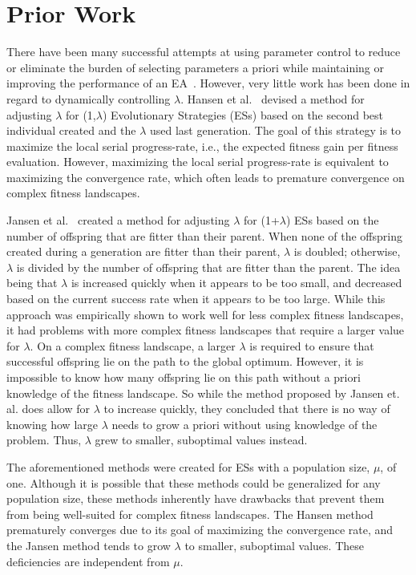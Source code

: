 \section{Prior Work} \label{sec:previous}

There have been many successful attempts at using parameter control to reduce or eliminate the burden of selecting parameters a priori while maintaining or improving the performance of an EA~\cite{paramsetting}. However, very little work has been done in regard to dynamically controlling $\lambda$. Hansen et al.~\cite{hansen:onsizing} devised a method for adjusting $\lambda$ for (1,$\lambda$) Evolutionary Strategies (ESs) based on the second best individual created and the $\lambda$ used last generation.  The goal of this strategy is to maximize the local serial progress-rate, i.e., the expected fitness gain per fitness evaluation.  However, maximizing the local serial progress-rate is equivalent to maximizing the convergence rate, which often leads to premature convergence on complex fitness landscapes.

Jansen et al.~\cite{jansen:choice} created a method for adjusting  $\lambda$ for (1+$\lambda$) ESs based on the number of offspring that are fitter than their parent.  When none of the offspring created during a generation are fitter than their parent, $\lambda$ is doubled; otherwise, $\lambda$ is divided by the number of offspring that are fitter than the parent.  The idea being that $\lambda$ is increased quickly when it appears to be too small, and decreased based on the current success rate when it appears to be too large.  While this approach was empirically shown to work well for less complex fitness landscapes, it had problems with more complex fitness landscapes that require a larger value for $\lambda$.  On a complex fitness landscape, a larger $\lambda$ is required to ensure that successful offspring lie on the path to the global optimum.  However, it is impossible to know how many offspring lie on this path without a priori knowledge of the fitness landscape.  So while the method proposed by Jansen et. al. does allow for  $\lambda$ to increase quickly, they concluded that there is no way of knowing how large $\lambda$ needs to grow a priori without using knowledge of the problem.  Thus, $\lambda$ grew to smaller, suboptimal values instead.

The aforementioned methods were created for ESs with a population size, $\mu$, of one.  Although it is possible that these methods could be generalized for any population size, these methods inherently have drawbacks that prevent them from being well-suited for complex fitness landscapes.  The Hansen method prematurely converges due to its goal of maximizing the convergence rate, and the Jansen method tends to grow $\lambda$ to smaller, suboptimal values.  These deficiencies are independent from $\mu$.  

